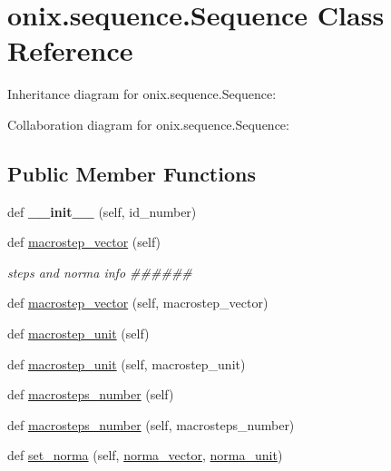 \hypertarget{classonix_1_1sequence_1_1Sequence}{}\section{onix.\+sequence.\+Sequence Class Reference}
\label{classonix_1_1sequence_1_1Sequence}


Inheritance diagram for onix.\+sequence.\+Sequence\+:


Collaboration diagram for onix.\+sequence.\+Sequence\+:
\subsection*{Public Member Functions}
\begin{DoxyCompactItemize}
\item 
\mbox{\label{classonix_1_1sequence_1_1Sequence_ad7af4cd879ecb9381727442bbcef3728}} 
def {\bfseries \+\_\+\+\_\+init\+\_\+\+\_\+} (self, id\+\_\+number)
\item 
def \hyperlink{classonix_1_1sequence_1_1Sequence_a2ae5761c119ef41525c82c5db6b9af33}{macrostep\+\_\+vector} (self)
\begin{DoxyCompactList}\small\item\em steps and norma info \#\#\#\#\#\# \end{DoxyCompactList}\item 
def \hyperlink{classonix_1_1sequence_1_1Sequence_ae0620ce8e449bf0a6a4181b179b6d0d9}{macrostep\+\_\+vector} (self, macrostep\+\_\+vector)
\item 
def \hyperlink{classonix_1_1sequence_1_1Sequence_ad30b07af38fcb327ddb27bfa3447a7a3}{macrostep\+\_\+unit} (self)
\item 
def \hyperlink{classonix_1_1sequence_1_1Sequence_adaa3417c90ead3932aa9da69962dd3ac}{macrostep\+\_\+unit} (self, macrostep\+\_\+unit)
\item 
def \hyperlink{classonix_1_1sequence_1_1Sequence_a328276e48dc885626226ab678ff9c085}{macrosteps\+\_\+number} (self)
\item 
def \hyperlink{classonix_1_1sequence_1_1Sequence_acf3011b7009e35380335cc1a1af4ee0a}{macrosteps\+\_\+number} (self, macrosteps\+\_\+number)
\item 
def \hyperlink{classonix_1_1sequence_1_1Sequence_a305d34a407ea3e779db74ee59c648fc4}{set\+\_\+norma} (self, \hyperlink{classonix_1_1sequence_1_1Sequence_a7c65d81c5dd1265034ba6c19c3aa6760}{norma\+\_\+vector}, \hyperlink{classonix_1_1sequence_1_1Sequence_a180c5c6bfafa1bceabce0c8365fb36f0}{norma\+\_\+unit})

\end{DoxyCompactItemize}
